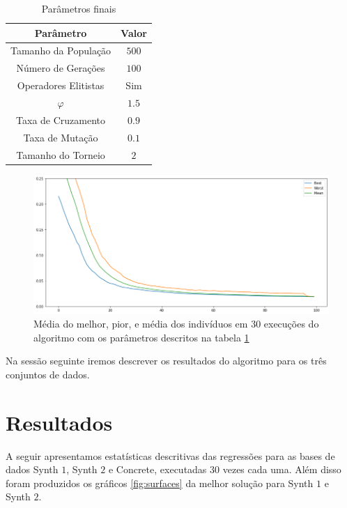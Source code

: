 \documentclass[10pt,twocolumn,letterpaper]{article}
\begin{document}
\begin{table}[H]
   \caption{Parâmetros finais}
   \centering
   \begin{tabular}{|c|c|}
    \hline
    Parâmetro & Valor \\
    \hline\hline
    Tamanho da População & $500$ \\
    \hline
    Número de Gerações & $100$ \\
    \hline
    Operadores Elitistas & Sim \\
    \hline
    $\varphi$ & $1.5$ \\
    \hline
    Taxa de Cruzamento & $0.9$ \\
    \hline
    Taxa de Mutação & $0.1$ \\
    \hline
    Tamanho do Torneio & $2$ \\
    \hline

   \end{tabular}
   \label{tab:param}

\end{table}

\begin{figure}[H]
   \begin{center}
   \includegraphics[width=\linewidth]{final.png}
   \end{center}
      \caption{Média do melhor, pior, e média dos indivíduos em 30 execuções do algoritmo com os parâmetros descritos na tabela \ref{tab:param}}
      \label{fig:final}
\end{figure}

Na sessão seguinte iremos descrever os resultados do algoritmo para os três conjuntos de dados.

\section{Resultados}

A seguir apresentamos estatísticas descritivas das regressões para as bases de dados Synth $1$, Synth $2$ e Concrete, executadas $30$ vezes cada uma. Além disso foram produzidos os gráficos \ref{fig:surfaces} da melhor solução para Synth $1$ e Synth $2$.
\end{document}
